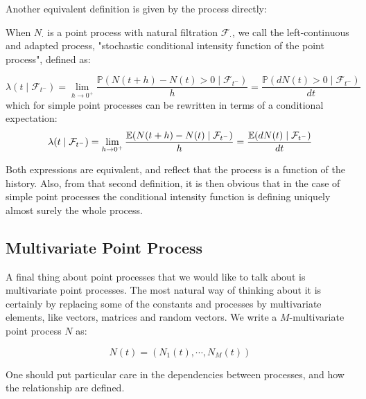 Another equivalent definition is given by the process directly:


\begin{definition}
When $N_{\cdot}$ is a point process with natural filtration $\mathcal F_{\cdot}$, we call the left-continuous and adapted process, "stochastic conditional intensity function of the point process", defined as:

\begin{equation}
 \lambda(t \mid \mathcal F_{t^-} ) = \lim_{h \to 0^+ } \frac{\mathbb P( N(t+h) - N(t) > 0 \mid \mathcal F_{t^-} )} {h} = \frac{\mathbb P ( dN(t) > 0  \mid \mathcal F_{t^-}) }{dt}
\end{equation}
which for simple point processes can be rewritten in terms of a conditional expectation:
\begin{equation}
 \lambda(t \mid \mathcal F_{t^-} ) = \lim_{h \to 0^+ } \frac{\mathbb E( N(t+h) - N(t)  \mid \mathcal F_{t^-} )} {h} = \frac{\mathbb E ( dN(t)  \mid \mathcal F_{t^-}) }{dt}
\end{equation}
\end{definition}

Both expressions are equivalent, and reflect that the process is a function of the history. Also, from that second definition, it is then obvious that in the case of simple point processes the conditional intensity function is defining uniquely almost surely the whole process.


\subsection{Multivariate Point Process}
A final thing about point processes that we would like to talk about is multivariate point processes. The most natural way of thinking about it is certainly by replacing some of the constants and processes by multivariate elements, like vectors, matrices and random vectors. We write a $M$-multivariate point process $N$ as:

\begin{equation}
N(t) = \left ( N_1(t), \cdots, N_M(t) \right )
\end{equation}

One should put particular care in the dependencies between processes, and how the relationship are defined. 












